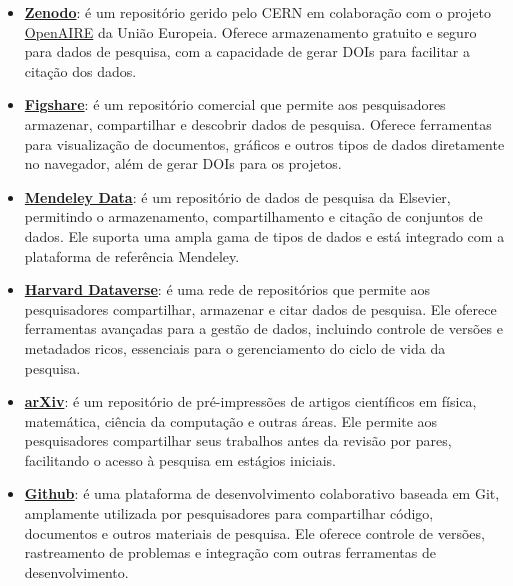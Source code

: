\documentclass[
  a4paper,
]{article}
\providecommand{\tightlist}{%
  \setlength{\itemsep}{0pt}\setlength{\parskip}{0pt}}\usepackage{longtable,booktabs,array}
\begin{document}
\begin{itemize}
\tightlist
\item
  \href{www.zenodo.org}{\textbf{Zenodo}}: é um repositório gerido pelo
  CERN em colaboração com o projeto
  \href{https://www.openaire.eu/}{OpenAIRE} da União Europeia. Oferece
  armazenamento gratuito e seguro para dados de pesquisa, com a
  capacidade de gerar DOIs para facilitar a citação dos dados.
\item
  \href{www.figshare.com}{\textbf{Figshare}}: é um repositório comercial
  que permite aos pesquisadores armazenar, compartilhar e descobrir
  dados de pesquisa. Oferece ferramentas para visualização de
  documentos, gráficos e outros tipos de dados diretamente no navegador,
  além de gerar DOIs para os projetos.
\item
  \href{data.mendeley.com}{\textbf{Mendeley Data}}: é um repositório de
  dados de pesquisa da Elsevier, permitindo o armazenamento,
  compartilhamento e citação de conjuntos de dados. Ele suporta uma
  ampla gama de tipos de dados e está integrado com a plataforma de
  referência Mendeley.
\item
  \href{dataverse.harvard.edu}{\textbf{Harvard Dataverse}}: é uma rede
  de repositórios que permite aos pesquisadores compartilhar, armazenar
  e citar dados de pesquisa. Ele oferece ferramentas avançadas para a
  gestão de dados, incluindo controle de versões e metadados ricos,
  essenciais para o gerenciamento do ciclo de vida da pesquisa.
\item
  \href{arxiv.org}{\textbf{arXiv}}: é um repositório de pré-impressões
  de artigos científicos em física, matemática, ciência da computação e
  outras áreas. Ele permite aos pesquisadores compartilhar seus
  trabalhos antes da revisão por pares, facilitando o acesso à pesquisa
  em estágios iniciais.
\item
  \href{github.com}{\textbf{Github}}: é uma plataforma de
  desenvolvimento colaborativo baseada em Git, amplamente utilizada por
  pesquisadores para compartilhar código, documentos e outros materiais
  de pesquisa. Ele oferece controle de versões, rastreamento de
  problemas e integração com outras ferramentas de desenvolvimento.
\end{itemize}
\end{document}
